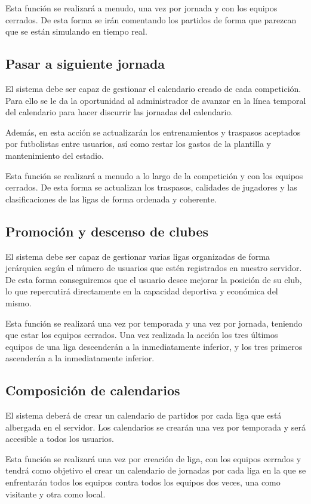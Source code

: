 Esta función se realizará a menudo, una vez por jornada y con los equipos
cerrados. De esta forma se irán comentando los partidos de forma que parezcan
que se están simulando en tiempo real.

\subsection*{Pasar a siguiente jornada}
El sistema debe ser capaz de gestionar el calendario creado de cada
competición. Para ello se le da la oportunidad al administrador de avanzar en la
línea temporal del calendario para hacer discurrir las jornadas del calendario.

Además, en esta acción se actualizarán los entrenamientos y traspasos aceptados
por futbolistas entre usuarios, así como restar los gastos de la plantilla y
mantenimiento del estadio.

Esta función se realizará a menudo a lo largo de la competición y con los
equipos cerrados. De esta forma se actualizan los traspasos, calidades de
jugadores y las clasificaciones de las ligas de forma ordenada y coherente.

\subsection*{Promoción y descenso de clubes}
El sistema debe ser capaz de gestionar varias ligas organizadas de forma
jerárquica según el número de usuarios que estén registrados en nuestro
servidor. De esta forma conseguiremos que el usuario desee mejorar la posición
de su club, lo que repercutirá directamente en la capacidad deportiva y
económica del mismo.

Esta función se realizará una vez por temporada y una vez por jornada, teniendo
que estar los equipos cerrados. Una vez realizada la acción los tres últimos
equipos de una liga descenderán a la inmediatamente inferior, y los tres
primeros ascenderán a la inmediatamente inferior.

\subsection*{Composición de calendarios}
El sistema deberá de crear un calendario de partidos por cada liga que está
albergada en el servidor. Los calendarios se crearán una vez por temporada y
será accesible a todos los usuarios.

Esta función se realizará una vez por creación de liga, con los equipos cerrados y tendrá como objetivo el
crear un calendario de jornadas por cada liga en la que se enfrentarán todos los
equipos contra todos los equipos dos veces, una como visitante y otra como local.
